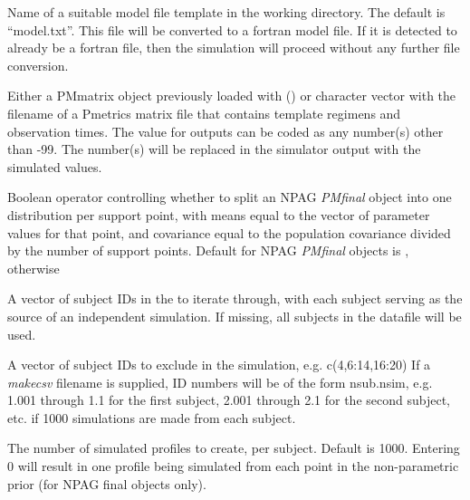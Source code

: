 \documentclass[a4paper]{book}
\begin{document}
\begin{Arguments}
\begin{ldescription}
\item[\code{model}] Name of a suitable model file template in the working directory.
The default is ``model.txt''.  This file will be converted to a fortran model file.
If it is detected to already be a fortran file, then the simulation will proceed without any further
file conversion.

\item[\code{data}] Either a PMmatrix object previously loaded with () or character vector with the filename of a Pmetrics matrix file
that contains template regimens and observation times.  The value for outputs can be coded as
any number(s) other than -99.  The number(s) will be replaced in the simulator output with the simulated values.

\item[\code{split}] Boolean operator controlling whether to split an NPAG \emph{PMfinal} object into one distribution
per support point, with means equal to the vector of parameter values for that point, and covariance equal to
the population covariance divided by the number of support points.  Default for NPAG \emph{PMfinal} objects is , otherwise 

\item[\code{include}] A vector of subject IDs in the  to iterate through, with each subject
serving as the source of an independent simulation.  If missing, all subjects in the datafile will be used.

\item[\code{exclude}] A vector of subject IDs to exclude in the simulation, e.g. c(4,6:14,16:20)
If a \emph{makecsv} filename is supplied, ID numbers will be of the form nsub.nsim, e.g. 1.001 through 1.1 for the
first subject, 2.001 through 2.1 for the second subject, etc. if 1000 simulations are made from each subject.

\item[\code{nsim}] The number of simulated profiles to create, per subject.  Default is 1000.  Entering 0 will result in one profile being simulated from each
point in the non-parametric prior (for NPAG final objects only).


\end{ldescription}
\end{Arguments}
\end{document}
